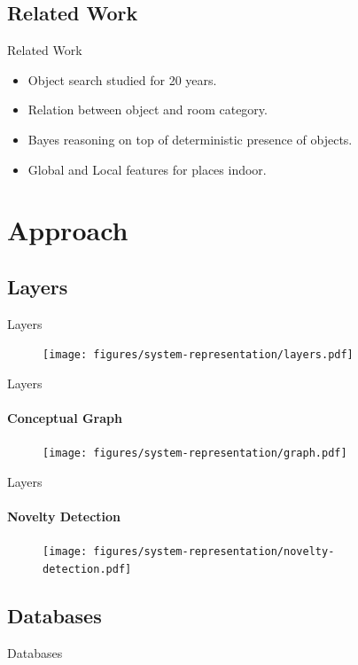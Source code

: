 \documentclass[compress]{beamer}
\begin{document}
\subsection{Related Work}
\begin{frame}{Related Work}
\begin{itemize}
    \item Object search studied for 20 years\cite{shubina2010}.
    \item Relation between object and room category\cite{galindo2005}.
    \item Bayes reasoning on top of deterministic presence of objects\cite{vasudevan2008}.
    \item Global and Local features for places indoor\cite{quattoni2009recognizing}.
\end{itemize}
\end{frame}

\section{Approach}
\subsection{Layers}
\begin{frame}{Layers}
    \begin{figure}
        \texttt{[image: figures/system-representation/layers.pdf]}
    \end{figure}
\end{frame}

\begin{frame}{Layers}
\framesubtitle{Conceptual Graph}
    \begin{figure}
        \texttt{[image: figures/system-representation/graph.pdf]}
    \end{figure}
\end{frame}

\begin{frame}{Layers}
\framesubtitle{Novelty Detection}
    \begin{figure}
        \texttt{[image: figures/system-representation/novelty-detection.pdf]}
    \end{figure}
\end{frame}

\subsection{Databases}
\begin{frame}{Databases}

\end{frame}
\end{document}
